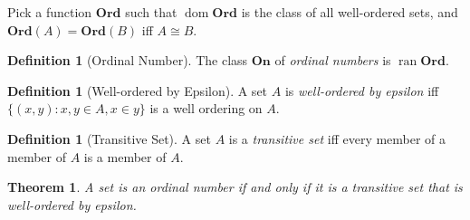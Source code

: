 \documentclass{report}
\newtheorem{theorem}[axiom]{Theorem}
\theoremstyle{definition}
\newtheorem{definition}[axiom]{Definition}
\newcommand{\dom}{\ensuremath{\operatorname{dom}}}
\newcommand{\ran}{\ensuremath{\operatorname{ran}}}
\begin{document}
    Pick a function $\mathbf{Ord}$ such that $\dom \mathbf{Ord}$ is the class of all well-ordered sets,
    and $\mathbf{Ord}(A) = \mathbf{Ord}(B)$ iff $A \cong B$. 

    \begin{definition}[Ordinal Number]
        The class $\mathbf{On}$ of \emph{ordinal numbers} is $\ran \mathbf{Ord}$.
    \end{definition}

    \begin{definition}[Well-ordered by Epsilon]
        A set $A$ is \emph{well-ordered by epsilon} iff $\{ (x,y) : x, y \in A, x \in y \}$ is a well
        ordering on $A$.
    \end{definition}

    \begin{definition}[Transitive Set]
        A set $A$ is a \emph{transitive set} iff every member of a member of $A$ is a member of $A$.
    \end{definition}

    \begin{theorem}
        \label{theorem:ordinals}
        A set is an ordinal number if and only if it is a transitive set that is well-ordered by epsilon.
    \end{theorem}
\end{document}
